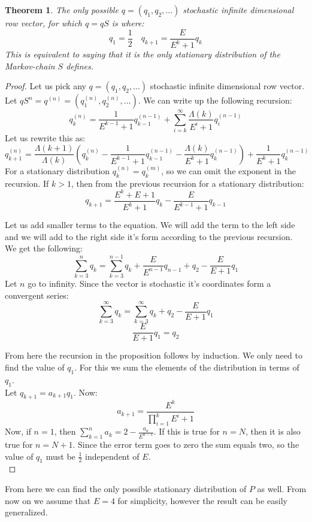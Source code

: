 \documentclass{article}
\newtheorem{theorem}{Theorem}[section]
\begin{document}
\begin{theorem}
The only possible $q = (q_1, q_2, ...)$ stochastic infinite dimensional row vector, for which $q = qS$ is where:\[
q_1 =\frac{1}{2} \quad q_{k+1}=\frac{E}{E^k+1}q_{k}
\]
This is equivalent to saying that it is the only stationary distribution of the Markov-chain $S$ defines.
\end{theorem}

\begin{proof}
Let us pick any $q = (q_1, q_2, ...)$ stochastic infinite dimensional row vector. Let $qS^n = q^{(n)} = (q^{(n)}_1, q^{(n)}_2,...)$. We can write up the following recursion:
\[
q_k^{(n)}=\frac{1}{E^{k-1}+1}q_{k-1}^{(n-1)}+\sum_{i=k}^{\infty} \frac{\Lambda(k)}{E^i+1}q_i^{(n-1)}
\]
Let us rewrite this as:
\[
q_{k+1}^{(n)}=\frac{\Lambda(k+1)}{\Lambda(k)}(q_{k}^{(n)}-\frac{1}{E^{k-1}+1}q_{k-1}^{(n-1)}-\frac{\Lambda(k)}{E^k+1}q_{k}^{(n-1)})+\frac{1}{E^k+1}q_k^{(n-1)}
\]
For a stationary distribution $q_k^{(n)}=q_k^{(m)}$, so we can omit the exponent in the recursion. If $k>1$, then from the previous recursion for a stationary distribution:
\[
q_{k+1}=\frac{E^k+E+1}{E^k+1}q_k-\frac{E}{E^{k-1}+1}q_{k-1}
\]

Let us add smaller terms to the equation. We will add the term to the left side and we will add to the right side it's form according to the previous recursion. We get the following:
\[
\sum_{k=3}^n q_k = \sum_{k=3}^{n-1} q_k + \frac{E}{E^{n-1}}q_{n-1}+q_2-\frac{E}{E+1}q_1
\]
Let $n$ go to infinity. Since the vector is stochastic it's coordinates form a convergent series:
\[
\sum_{k=3}^{\infty} q_k = \sum_{k=3}^{\infty} q_k +q_2-\frac{E}{E+1}q_1
\]
\[
\frac{E}{E+1}q_1 =  q_2 
\]

From here the recursion in the proposition follows by induction. We only need to find the value of $q_1$. For this we sum the elements of the distribution in terms of $q_1$.\\

Let $q_{k+1}=a_{k+1}q_1$. Now:
\[
a_{k+1}=\frac{E^k}{\prod_{i=1}^{k}E^i+1}
\]
Now, if $n=1$, then $\sum_{k=1}^n a_k=2-\frac{a_n}{E^{n-1}}$. If this is true for $n=N$, then it is also true for $n=N+1$. Since the error term goes to zero the sum equals two, so the value of $q_1$ must be $\frac{1}{2}$ independent of $E$.\\

\end{proof}

From here we can find the only possible stationary distribution of $P$ as well. From now on we assume that $E = 4$ for simplicity, however the result can be easily generalized. 
\end{document}
